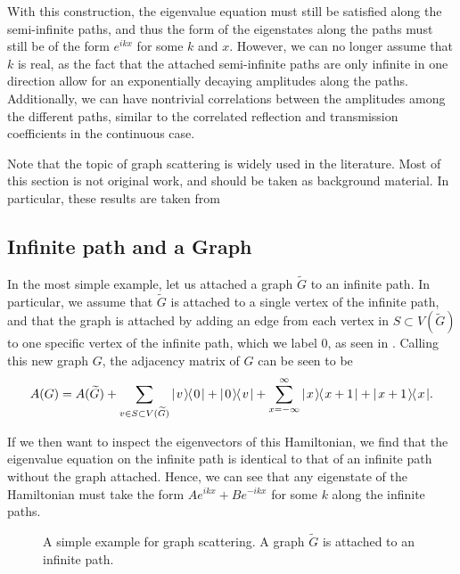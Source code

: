 \documentclass[../thesis-main/thesis-main]{subfiles}
\begin{document}
With this construction, the eigenvalue equation must still be satisfied along the semi-infinite paths, and thus the form of the eigenstates along the paths must still be of the form $e^{i k x}$ for some $k$ and $x$.  However, we can no longer assume that $k$ is real, as the fact that the attached semi-infinite paths are only infinite in one direction allow for an exponentially decaying amplitudes along the paths.  Additionally, we can have nontrivial correlations between the amplitudes among the different paths, similar to the correlated reflection and transmission coefficients in the continuous case.

Note that the topic of graph scattering is widely used in the literature.  Most of this section is not original work, and should be taken as background material.  In particular, these results are taken from \cite{FGG08, Chi09, CS11, CG12}


\subsection{Infinite path and a Graph}

In the most simple example, let us attached a graph $\widetilde{G}$ to an infinite path.  In particular, we assume that $\widetilde{G}$ is attached to a single vertex of the infinite path, and that the graph is attached by adding an edge from each vertex in $S\subset V(\widetilde{G})$ to one specific vertex of the infinite path, which we label $0$, as seen in .  Calling this new graph $G$, the adjacency matrix of $G$ can be seen to be
\begin{equation}
  A(G) = A(\widetilde{G}) + \sum_{v\in S \subset V(\widetilde{G})} |\mspace{2mu} v \mspace{2mu} \rangle\mspace{-2mu}\langle\mspace{2mu} 0 \mspace{2mu} | + |\mspace{2mu} 0 \mspace{2mu} \rangle\mspace{-2mu}\langle\mspace{2mu} v \mspace{2mu} | + \sum_{x=-\infty}^\infty |\mspace{2mu} x \mspace{2mu} \rangle\mspace{-2mu}\langle\mspace{2mu} x+1 \mspace{2mu} | + |\mspace{2mu} x+1 \mspace{2mu} \rangle\mspace{-2mu}\langle\mspace{2mu} x \mspace{2mu} |.
\end{equation}

If we then want to inspect the eigenvectors of this Hamiltonian, we find that the eigenvalue equation on the infinite path is identical to that of an infinite path without the graph attached.  Hence, we can see that any eigenstate of the Hamiltonian must take the form $Ae^{i k x} + Be^{-i k x}$ for some $k$ along the infinite paths.  


\begin{figure}
  \centering
  
  \caption{A simple example for graph scattering.  A graph $\widetilde{G}$ is attached to an infinite path.}
  \label{fig:path_and_graph}
\end{figure}
\end{document}
